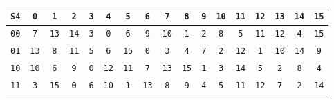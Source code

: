 \documentclass{article}
\begin{document}
\begin{center}
\vspace{10pt}
\begin{tabular}{|c|cccccccccccccccc|}
  \hline
\texttt{S4} & \texttt{0} & \texttt{1} & \texttt{2} & \texttt{3} & \texttt{4} & \texttt{5} & \texttt{6} & \texttt{7} & \texttt{8} & \texttt{9} & \texttt{10} & \texttt{11} & \texttt{12} & \texttt{13} & \texttt{14} & \texttt{15} \\
\hline
\texttt{0}\texttt{0} & \texttt{7} & \texttt{1}\texttt{3} & \texttt{1}\texttt{4} & \texttt{3} & \texttt{0} & \texttt{6} & \texttt{9} & \texttt{1}\texttt{0} & \texttt{1} & \texttt{2} & \texttt{8} & \texttt{5} & \texttt{1}\texttt{1} & \texttt{1}\texttt{2} & \texttt{4} & \texttt{1}\texttt{5} \\
\texttt{0}\texttt{1} & \texttt{1}\texttt{3} & \texttt{8} & \texttt{1}\texttt{1} & \texttt{5} & \texttt{6} & \texttt{1}\texttt{5} & \texttt{0} & \texttt{3} & \texttt{4} & \texttt{7} & \texttt{2} & \texttt{1}\texttt{2} & \texttt{1} & \texttt{1}\texttt{0} & \texttt{1}\texttt{4} & \texttt{9} \\
\texttt{1}\texttt{0} & \texttt{1}\texttt{0} & \texttt{6} & \texttt{9} & \texttt{0} & \texttt{1}\texttt{2} & \texttt{1}\texttt{1} & \texttt{7} & \texttt{1}\texttt{3} & \texttt{1}\texttt{5} & \texttt{1} & \texttt{3} & \texttt{1}\texttt{4} & \texttt{5} & \texttt{2} & \texttt{8} & \texttt{4} \\
\texttt{1}\texttt{1} & \texttt{3} & \texttt{1}\texttt{5} & \texttt{0} & \texttt{6} & \texttt{1}\texttt{0} & \texttt{1} & \texttt{1}\texttt{3} & \texttt{8} & \texttt{9} & \texttt{4} & \texttt{5} & \texttt{1}\texttt{1} & \texttt{1}\texttt{2} & \texttt{7} & \texttt{2} & \texttt{1}\texttt{4} \\
\hline
\end{tabular}


\end{center}
\end{document}
